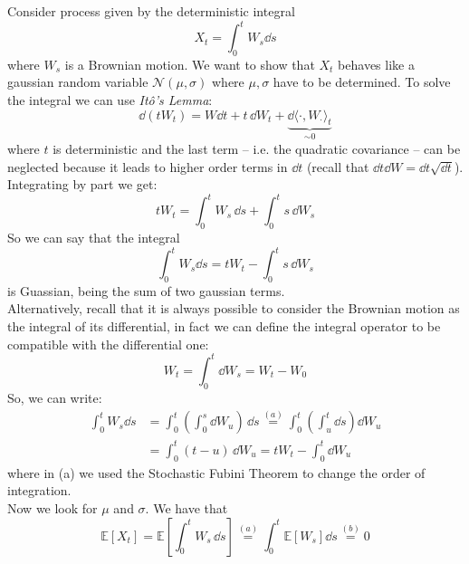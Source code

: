 \begin{example}{}{}{}
    Consider process given by the deterministic integral 
    \begin{equation*}
        X_t = \int^t_0 W_s\dd s
    \end{equation*}
    where $W_s$ is a Brownian motion. We want to show that $X_t$ behaves like a gaussian random variable $\mathcal{N}(\mu,\sigma)$ where $\mu, \sigma$ have to be determined. To solve the integral we can use \emph{Itô's Lemma}:
    \begin{equation*}
        \dd(tW_t) = W\dd t + t\,\dd W_t + \underbrace{\dd\langle\cdot,W_{\cdot}\rangle_t}_{\sim 0}
    \end{equation*}
    where $t$ is deterministic and the last term -- i.e. the quadratic covariance -- can be neglected because it leads to higher order terms in $\dd t$ (recall that $\dd t\dd W = \dd t\sqrt{\dd t}$). Integrating by part we get:
    \begin{equation*}
        tW_t = \int^t_0 W_s\,\dd s + \int^t_0 s\,\dd W_s
    \end{equation*}
    So we can say that the integral
    \begin{equation*}
        \int^t_0 W_s\dd s = tW_t - \int^t_0 s\,\dd W_s
    \end{equation*}
    is Guassian, being the sum of two gaussian terms. \\
    Alternatively, recall that it is always possible to consider the Brownian motion as the integral of its differential, in fact we can define the integral operator to be compatible with the differential one:
    \begin{equation*}
        W_t = \int^t_0 \dd W_s = W_t - W_0
    \end{equation*}
    So, we can write:
    \begin{align*}
        \int^t_0 W_s\dd s &= \int^t_0\left(\int^s_0 \dd W_u\right)\,\dd s \overset{(a)}{=} \int^t_0\left(\int^t_u \dd s\right)\dd W_u \\
        &= 
        \int^t_0(t-u)\,\dd W_u = tW_t - \int^t_0\dd W_u
    \end{align*}
    where in (a) we used the Stochastic Fubini Theorem to change the order of integration.\\
    Now we look for $\mu$ and $\sigma$. We have that 
    \begin{equation*}
        \mathbb{E}[X_t] = \mathbb{E}\left[\int^t_0 W_s\,\dd s \right] \overset{(a)}{=} \int^t_0 \mathbb{E}[W_s]\dd s \overset{(b)}{=} 0
    \end{equation*}

\end{example}
